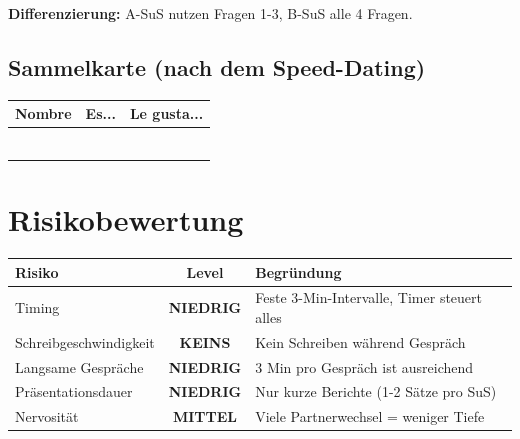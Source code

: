 \documentclass[11pt, a4paper]{article}
\begin{document}
\textbf{Differenzierung:} A-SuS nutzen Fragen 1-3, B-SuS alle 4 Fragen.

\subsection{Sammelkarte (nach dem Speed-Dating)}

\begin{center}
\begin{tabular}{|p{3cm}|p{4cm}|p{4cm}|}
    \hline
    \textbf{Nombre} & \textbf{Es...} & \textbf{Le gusta...} \\
    \hline
    & & \\[0.8cm]
    \hline
    & & \\[0.8cm]
    \hline
    & & \\[0.8cm]
    \hline
    & & \\[0.8cm]
    \hline
    & & \\[0.8cm]
    \hline
    & & \\[0.8cm]
    \hline
\end{tabular}
\end{center}


\section{Risikobewertung}

\begin{center}
\begin{tabular}{|l|c|p{6cm}|}
    \hline
    \textbf{Risiko} & \textbf{Level} & \textbf{Begründung} \\
    \hline
    Timing & \textcolor{success}{\textbf{NIEDRIG}} & Feste 3-Min-Intervalle, Timer steuert alles \\
    \hline
    Schreibgeschwindigkeit & \textcolor{success}{\textbf{KEINS}} & Kein Schreiben während Gespräch \\
    \hline
    Langsame Gespräche & \textcolor{success}{\textbf{NIEDRIG}} & 3 Min pro Gespräch ist ausreichend \\
    \hline
    Präsentationsdauer & \textcolor{success}{\textbf{NIEDRIG}} & Nur kurze Berichte (1-2 Sätze pro SuS) \\
    \hline
    Nervosität & \textcolor{warning}{\textbf{MITTEL}} & Viele Partnerwechsel = weniger Tiefe \\
    \hline
\end{tabular}
\end{center}
\end{document}
